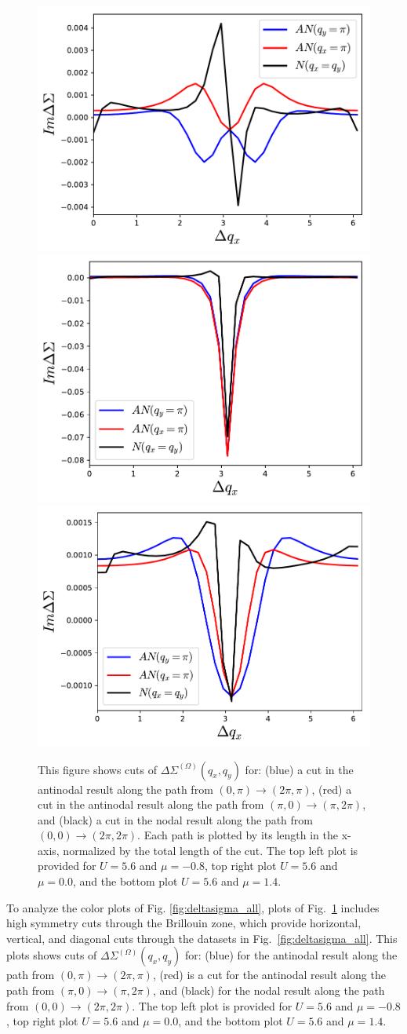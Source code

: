 \begin{figure}[ht]
\centering
    \includegraphics[width=0.45\linewidth]{fig3/3cuts_mu-8.pdf}
    \includegraphics[width=0.45\linewidth]{fig3/3cuts_mu0.pdf}
    \includegraphics[width=0.45\linewidth]{fig3/3cuts_mu14.pdf}
    
\caption{This figure shows cuts of $\Delta \Sigma^{(\Omega)}(q_x,q_y)$ for: (blue) a cut in the antinodal result along the path from $(0,\pi) \to (2\pi,\pi)$, (red) a cut in the antinodal result along the path from $(\pi,0) \to (\pi,2\pi)$, and (black) a cut in the nodal result along the path from $(0,0)\to(2\pi,2\pi)$. Each path is plotted by its length in the x-axis, normalized by the total length of the cut. The top left plot is provided for $U=5.6$ and $\mu=-0.8$, top right plot $U=5.6$ and $\mu=0.0$, and the bottom plot $U=5.6$ and $\mu=1.4$.
\label{fig:3cuts}}
\end{figure}

To  analyze the color plots of Fig. \ref{fig:deltasigma_all}, plots of Fig.~\ref{fig:3cuts} includes high symmetry cuts through the Brillouin zone, which provide horizontal, vertical, and diagonal cuts through the datasets in Fig.~\ref{fig:deltasigma_all}. This plots shows cuts of $\Delta \Sigma^{(\Omega)}(q_x,q_y)$ for: (blue) for the antinodal result along the path from $(0,\pi) \to (2\pi,\pi)$, (red) is a cut for the antinodal result along the path from $(\pi,0) \to (\pi,2\pi)$, and (black) for the nodal result along the path from $(0,0)\to(2\pi,2\pi)$. The top left plot is provided for $U=5.6$ and $\mu=-0.8$, top right plot $U=5.6$ and $\mu=0.0$, and the bottom plot $U=5.6$ and $\mu=1.4$.

